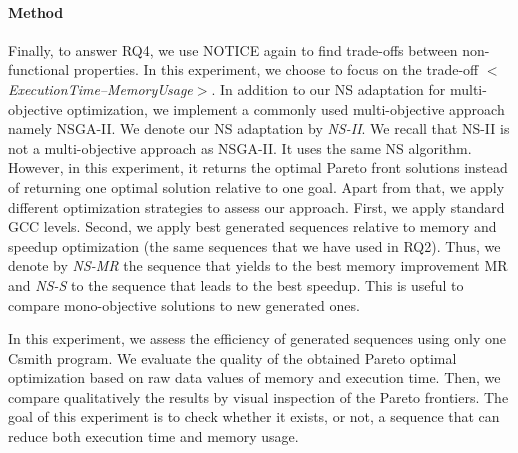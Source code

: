 \paragraph{Method}
Finally, to answer RQ4, we use NOTICE again to find trade-offs between non-functional properties. In this experiment, we choose to focus on the trade-off \textit{$<$ExecutionTime--MemoryUsage$>$}. In addition to our NS adaptation for multi-objective optimization, we implement a commonly used multi-objective approach namely NSGA-II\cite{deb2002fast}. We denote our NS adaptation by \textit{NS-II}. We recall that NS-II is not a multi-objective approach as NSGA-II. It uses the same NS algorithm. However, in this experiment, it returns the optimal Pareto front solutions instead of returning one optimal solution relative to one goal. 
Apart from that, we apply different optimization strategies to assess our approach. First, we apply standard GCC levels. Second, we apply best generated sequences relative to memory and speedup optimization (the same sequences that we have used in RQ2). Thus, we denote by \textit{NS-MR} the sequence that yields to the best memory improvement MR and \textit{NS-S} to the sequence that leads to the best speedup. This is useful to compare mono-objective solutions to new generated ones.

In this experiment, we assess the efficiency of generated sequences using only one Csmith program.
We evaluate the quality of the obtained Pareto optimal optimization based on raw data values of memory and execution time. Then, we compare qualitatively the results by visual inspection of the Pareto frontiers.
The goal of this experiment is to check whether it exists, or not, a sequence that can reduce both execution time and memory usage.




